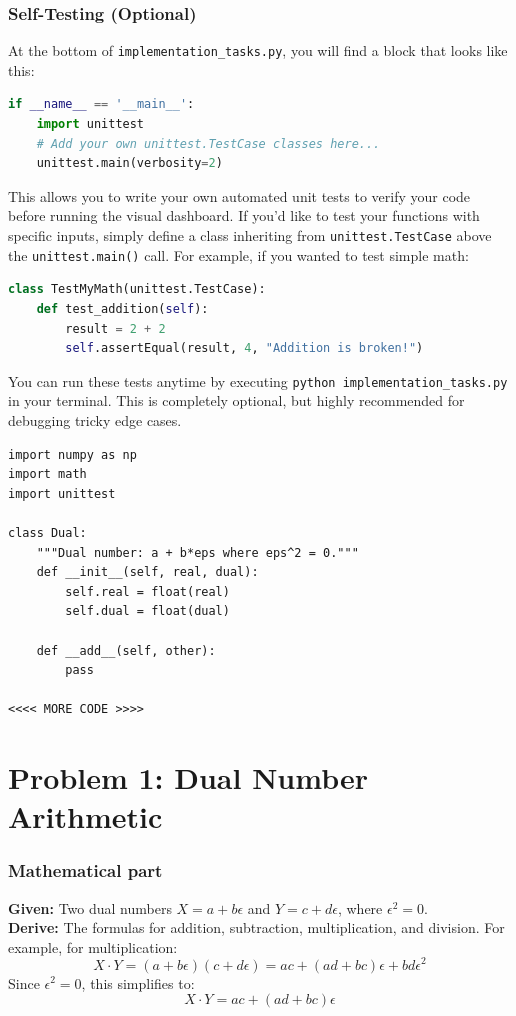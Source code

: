 \documentclass[11pt]{article}
\begin{document}
\subsubsection*{Self-Testing (Optional)}
At the bottom of \lstinline|implementation_tasks.py|, you will find a block that looks like this:
\begin{lstlisting}[language=Python]
if __name__ == '__main__':
    import unittest
    # Add your own unittest.TestCase classes here...
    unittest.main(verbosity=2)
\end{lstlisting}
This allows you to write your own automated unit tests to verify your code before running the visual dashboard. If you'd like to test your functions with specific inputs, simply define a class inheriting from \lstinline|unittest.TestCase| above the \lstinline|unittest.main()| call. For example, if you wanted to test simple math:
\begin{lstlisting}[language=Python]
class TestMyMath(unittest.TestCase):
    def test_addition(self):
        result = 2 + 2
        self.assertEqual(result, 4, "Addition is broken!")
\end{lstlisting}
You can run these tests anytime by executing \lstinline|python implementation_tasks.py| in your terminal. This is completely optional, but highly recommended for debugging tricky edge cases.
\begin{lstlisting}
import numpy as np
import math
import unittest

class Dual:
    """Dual number: a + b*eps where eps^2 = 0."""
    def __init__(self, real, dual):
        self.real = float(real)
        self.dual = float(dual)

    def __add__(self, other):
        pass

<<<< MORE CODE >>>>
\end{lstlisting}

\section*{Problem 1: Dual Number Arithmetic}

\subsubsection*{Mathematical part}
\textbf{Given:} Two dual numbers $X = a + b\epsilon$ and $Y = c + d\epsilon$, where $\epsilon^2 = 0$. \\
\textbf{Derive:} The formulas for addition, subtraction, multiplication, and division.
For example, for multiplication:
$$ X \cdot Y = (a + b\epsilon)(c + d\epsilon) = ac + (ad + bc)\epsilon + bd\epsilon^2 $$
Since $\epsilon^2 = 0$, this simplifies to:
$$ X \cdot Y = ac + (ad + bc)\epsilon $$
\end{document}
